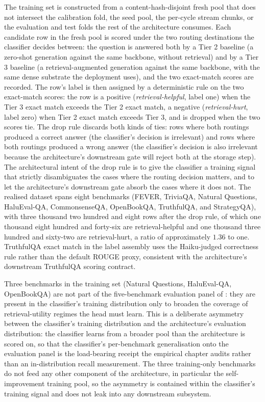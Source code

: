 The training set is constructed from a content-hash-disjoint fresh pool that does not intersect the calibration fold, the seed pool, the per-cycle stream chunks, or the evaluation and test folds the rest of the architecture consumes. Each candidate row in the fresh pool is scored under the two routing destinations the classifier decides between: the question is answered both by a Tier 2 baseline (a zero-shot generation against the same backbone, without retrieval) and by a Tier 3 baseline (a retrieval-augmented generation against the same backbone, with the same dense substrate the deployment uses), and the two exact-match scores are recorded. The row's label is then assigned by a deterministic rule on the two exact-match scores: the row is a positive (\emph{retrieval-helpful}, label one) when the Tier 3 exact match exceeds the Tier 2 exact match, a negative (\emph{retrieval-hurt}, label zero) when Tier 2 exact match exceeds Tier 3, and is dropped when the two scores tie. The drop rule discards both kinds of ties: rows where both routings produced a correct answer (the classifier's decision is irrelevant) and rows where both routings produced a wrong answer (the classifier's decision is also irrelevant because the architecture's downstream gate will reject both at the storage step). The architectural intent of the drop rule is to give the classifier a training signal that strictly disambiguates the cases where the routing decision matters, and to let the architecture's downstream gate absorb the cases where it does not. The realised dataset spans eight benchmarks (FEVER, TriviaQA, Natural Questions, HaluEval-QA, CommonsenseQA, OpenBookQA, TruthfulQA, and StrategyQA), with three thousand two hundred and eight rows after the drop rule, of which one thousand eight hundred and forty-six are retrieval-helpful and one thousand three hundred and sixty-two are retrieval-hurt, a ratio of approximately $1.36$ to one. TruthfulQA exact match in the label assembly uses the Haiku-judged correctness rule rather than the default ROUGE proxy, consistent with the architecture's downstream TruthfulQA scoring contract.

Three benchmarks in the training set (Natural Questions, HaluEval-QA, OpenBookQA) are not part of the five-benchmark evaluation panel of : they are present in the classifier's training distribution only to broaden the coverage of retrieval-utility regimes the head must learn. This is a deliberate asymmetry between the classifier's training distribution and the architecture's evaluation distribution: the classifier learns from a broader pool than the architecture is scored on, so that the classifier's per-benchmark generalisation onto the evaluation panel is the load-bearing receipt the empirical chapter audits rather than an in-distribution recall measurement. The three training-only benchmarks do not feed any other component of the architecture, in particular the self-improvement training pool, so the asymmetry is contained within the classifier's training signal and does not leak into any downstream subsystem.

